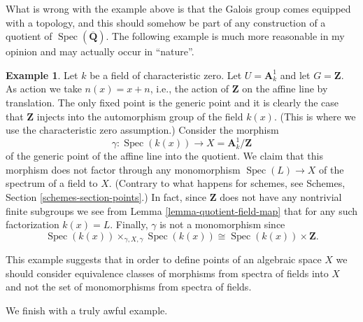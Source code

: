 \documentclass{stacks-project}
\theoremstyle{plain}
\theoremstyle{definition}
\newtheorem{example}[subsection]{Example}
\theoremstyle{remark}
\numberwithin{equation}{subsection}
\def\Spec{\mathop{\mathrm{Spec}}}
\begin{document}
\noindent
What is wrong with the example above is that
the Galois group comes equipped with a topology,
and this should somehow be part of any construction
of a quotient of $\Spec(\overline{\mathbf{Q}})$.
The following example is much more reasonable in my opinion
and may actually occur in ``nature''.

\begin{example}
\label{example-affine-line-translation}
Let $k$ be a field of characteristic zero.
Let $U = \mathbf{A}^1_k$ and let $G = \mathbf{Z}$.
As action we take $n(x) = x + n$, i.e., the action of
$\mathbf{Z}$ on the affine line by translation.
The only fixed point is the generic point and it
is clearly the case that $\mathbf{Z}$ injects into
the automorphism group of the field $k(x)$. (This is
where we use the characteristic zero assumption.)
Consider the morphism
$$
\gamma : \Spec(k(x)) \longrightarrow X = \mathbf{A}^1_k/\mathbf{Z}
$$
of the generic point of the affine line into the quotient.
We claim that this morphism does not factor through any
monomorphism $\Spec(L) \to X$ of the spectrum of
a field to $X$. (Contrary to what happens for schemes, see
Schemes, Section \ref{schemes-section-points}.) In fact, since
$\mathbf{Z}$ does not have any nontrivial finite subgroups we see from
Lemma \ref{lemma-quotient-field-map} that for any such
factorization $k(x) = L$. Finally, $\gamma$ is not a monomorphism
since
$$
\Spec(k(x)) \times_{\gamma, X, \gamma} \Spec(k(x))
\cong
\Spec(k(x)) \times \mathbf{Z}.
$$
\end{example}

\noindent
This example suggests that in order to define points of an algebraic space
$X$ we should consider equivalence classes of morphisms from spectra
of fields into $X$ and not the set of monomorphisms from spectra of fields.

\medskip\noindent
We finish with a truly awful example.
\end{document}
